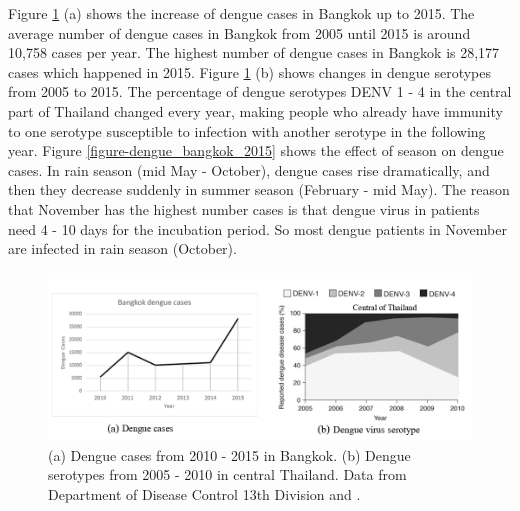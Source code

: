 \documentclass[review]{elsarticle}
\begin{document}



Figure \ref{figure-bangkok-data} (a) shows the increase of dengue cases in Bangkok up to 2015. The average number of dengue cases in Bangkok from 2005 until 2015 is around 10,758 cases per year. The highest number of dengue cases in Bangkok is 28,177 cases which happened in 2015. Figure \ref{figure-bangkok-data} (b) shows changes in dengue serotypes from 2005 to 2015. The percentage of dengue serotypes DENV 1 - 4 in the central part of Thailand changed every year, making people who already have immunity to one serotype susceptible to infection with another serotype in the following year. Figure \ref{figure-dengue_bangkok_2015} shows the effect of season on dengue cases. In rain season (mid May - October), dengue cases rise dramatically, and then they decrease suddenly in summer season (February - mid May). The reason that November has the highest number cases is that dengue virus in patients need 4 - 10 days for the incubation period. So most dengue patients in November are infected in rain season (October).  


\begin{figure}[htbp]
	\begin{center}
		\includegraphics[width=145mm]{./figures/bangkok_dengue_data}
		\caption{ (a) Dengue cases from 2010 - 2015 in Bangkok. (b) Dengue serotypes from 2005 - 2010 in central Thailand. Data from Department of Disease Control 13th Division and \protect\cite{limkittikul2014epidemiological}. }
		\label{figure-bangkok-data}
	\end{center}
\end{figure}
\end{document}
